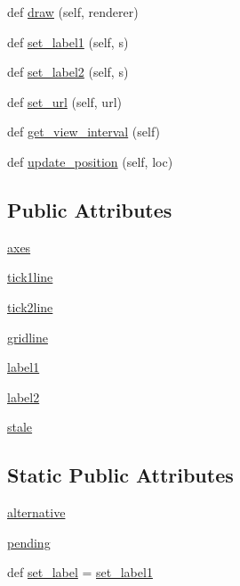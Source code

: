 \begin{DoxyCompactItemize}
\item 
def \hyperlink{classmatplotlib_1_1axis_1_1Tick_abfb1e735552da4151af7a860a5f1771e}{draw} (self, renderer)
\item 
def \hyperlink{classmatplotlib_1_1axis_1_1Tick_a0e0e19459866811984d8ca2f37cd35ba}{set\+\_\+label1} (self, s)
\item 
def \hyperlink{classmatplotlib_1_1axis_1_1Tick_a98c53487dd780a5a790f3490185c6e8c}{set\+\_\+label2} (self, s)
\item 
def \hyperlink{classmatplotlib_1_1axis_1_1Tick_a2e7996922e414216bd72ff010c1f55f1}{set\+\_\+url} (self, url)
\item 
def \hyperlink{classmatplotlib_1_1axis_1_1Tick_a26cbe77fa13766803c8f91b4f69f7ac0}{get\+\_\+view\+\_\+interval} (self)
\item 
def \hyperlink{classmatplotlib_1_1axis_1_1Tick_a8f1dafff62819c6f33d6473f7fac68cc}{update\+\_\+position} (self, loc)
\end{DoxyCompactItemize}
\subsection*{Public Attributes}
\begin{DoxyCompactItemize}
\item 
\hyperlink{classmatplotlib_1_1axis_1_1Tick_a8fc7266d394e93167cfad31c86a55394}{axes}
\item 
\hyperlink{classmatplotlib_1_1axis_1_1Tick_af94874c7d3c33fd2afba698a88a82f3e}{tick1line}
\item 
\hyperlink{classmatplotlib_1_1axis_1_1Tick_a25fff248d4a5fb3864d5f094e34b3db2}{tick2line}
\item 
\hyperlink{classmatplotlib_1_1axis_1_1Tick_ae0ceb96c623c9a806e1c0d120764c572}{gridline}
\item 
\hyperlink{classmatplotlib_1_1axis_1_1Tick_a65447dd320bff7ee75e252c3c8ecc71a}{label1}
\item 
\hyperlink{classmatplotlib_1_1axis_1_1Tick_a309c57bb8e15dab85e3e9f4d8864d971}{label2}
\item 
\hyperlink{classmatplotlib_1_1axis_1_1Tick_a471337434de6e80ca6607c02bbcee3de}{stale}
\end{DoxyCompactItemize}
\subsection*{Static Public Attributes}
\begin{DoxyCompactItemize}
\item 
\hyperlink{classmatplotlib_1_1axis_1_1Tick_a9875c44fd6283e22d6cee926a3c4f793}{alternative}
\item 
\hyperlink{classmatplotlib_1_1axis_1_1Tick_a3bb40edde7171c8c120886ac5dc03361}{pending}
\item 
def \hyperlink{classmatplotlib_1_1axis_1_1Tick_a71edd090286f9918bc0e434f357aacf2}{set\+\_\+label} = \hyperlink{classmatplotlib_1_1axis_1_1Tick_a0e0e19459866811984d8ca2f37cd35ba}{set\+\_\+label1}
\end{DoxyCompactItemize}


